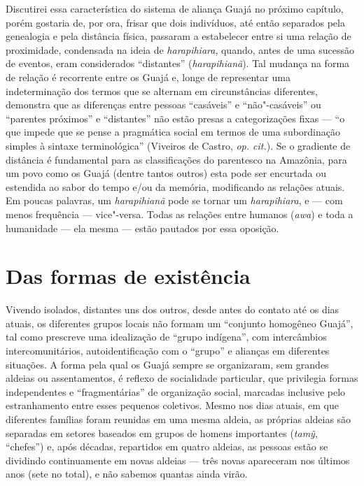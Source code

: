 Discutirei essa característica do sistema de aliança Guajá no próximo
capítulo, porém gostaria de, por ora, frisar que dois indivíduos, até
então separados pela genealogia e pela distância física, passaram a
estabelecer entre si uma relação de proximidade, condensada na ideia de
\emph{harapihiara}, quando, antes de uma sucessão de eventos, eram
considerados ``distantes'' (\emph{harapihianã}). Tal mudança na forma de
relação é recorrente entre os Guajá e, longe de representar uma
indeterminação dos termos que se alternam em circunstâncias diferentes,
demonstra que as diferenças entre pessoas ``casáveis'' e
``não"-casáveis'' ou ``parentes próximos'' e ``distantes'' não estão
presas a categorizações fixas --- ``o que impede que se pense a pragmática
social em termos de uma subordinação simples à sintaxe terminológica''
(Viveiros de Castro, \emph{op. cit.}). Se o gradiente de distância é
fundamental para as classificações do parentesco na Amazônia, para um
povo como os Guajá (dentre tantos outros) esta pode ser encurtada ou
estendida ao sabor do tempo e/ou da memória, modificando as relações
atuais. Em poucas palavras, um \emph{harapihianã} pode se tornar um
\emph{harapihiara}, e --- com menos frequência --- vice"-versa. Todas as
relações entre humanos (\emph{awa}) e toda a humanidade --- ela mesma ---
estão pautados por essa oposição.

\section{Das formas de existência}\label{das-formas-de-existuxeancia}

Vivendo isolados, distantes uns dos outros, desde antes do contato até
os dias atuais, os diferentes grupos locais não formam um ``conjunto
homogêneo Guajá'', tal como prescreve uma idealização de ``grupo
indígena'', com intercâmbios intercomunitários, autoidentificação com o
``grupo'' e alianças em diferentes situações. A forma pela qual os Guajá
sempre se organizaram, sem grandes aldeias ou assentamentos, é reflexo
de socialidade particular, que privilegia formas independentes e
``fragmentárias'' de organização social, marcadas inclusive pelo
estranhamento entre esses pequenos coletivos. Mesmo nos dias atuais, em
que diferentes famílias foram reunidas em uma mesma aldeia, as próprias
aldeias são separadas em setores baseados em grupos de homens
importantes (\emph{tamỹ}, ``chefes'') e, após décadas, repartidos em
quatro aldeias, as pessoas estão se dividindo continuamente em novas
aldeias --- três novas apareceram nos últimos anos (sete no total), e não
sabemos quantas ainda virão.

